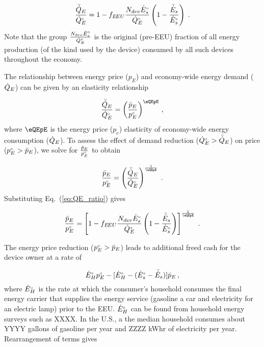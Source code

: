 \begin{equation} \label{eq:QE_ratio}
  \frac{\bar{\dot{Q}}_E}{{}{\dot{Q}}^{\scriptscriptstyle \circ}_E} =
        1 - f_{E\!EU} \frac{N_{dev} {}{\dot{E}}^{\scriptscriptstyle \circ}_s}{{}{\dot{Q}}^{\scriptscriptstyle \circ}_E} \left( 1 - \frac{\bar{\dot{E}}_s}{{}{\dot{E}}^{\scriptscriptstyle \circ}_s}  \right) \; .
\end{equation}
%
Note that the group $\frac{N_{dev} {}{\dot{E}}^{\scriptscriptstyle \circ}_s}{{}{\dot{Q}}^{\scriptscriptstyle \circ}_E}$
is the original (pre-EEU) fraction of all energy production
(of the kind used by the device)
consumed by all such devices throughout the economy.

The relationship between energy price ($p_E$) and
economy-wide energy demand ($\dot{Q}_E$)
can be given by an elasticity relationship

\begin{equation}
  \frac{\rainc{Q}_E}{\rorig{Q}_E} = 
          \left( \frac{\ainc{p}_E}{\orig{p}_E} \right)^{\eQEpE} \, ,
\end{equation}
%
where $\eQEpE$ is the energy price ($p_e$) elasticity
of economy-wide energy consumption ($\dot{Q}_E$).
To assess the effect of demand reduction
(${}{\dot{Q}}^{\scriptscriptstyle \circ}_E > \bar{\dot{Q}}_E$)
on price
(${}{p}^{\scriptscriptstyle \circ}_E > \bar{p}_E$),
we solve for $\frac{\bar{p}_E}{{}{p}^{\scriptscriptstyle \circ}_E}$
to obtain

\begin{equation}
  \frac{\ainc{p}_E}{\orig{p}_E} =
        \left( \frac{\rainc{Q}_E}{\rorig{Q}_E} \right)^{\frac{1}{\eQEpE}} \; .
\end{equation}
%
Substituting Eq.~(\ref{eq:QE_ratio}) gives

\begin{equation}
  \frac{\ainc{p}_E}{\orig{p}_E} =
        \left[ 1 - f_{\EEU} \frac{N_{dev} \rbempl{E}_s}{\rbempl{Q}_E} \left( 1 - \frac{\rainc{E}_s}{\rbempl{E}_s}  \right) \right]^{\frac{1}{\eQEpE}} \; .
\end{equation}

The energy price reduction (${}{p}^{\scriptscriptstyle \circ}_E > \bar{p}_E$)
leads to additional freed cash for the device owner at a rate of

\begin{equation}
  {}{\dot{E}}^{\scriptscriptstyle \circ}_H {}{p}^{\scriptscriptstyle \circ}_E - [{}{\dot{E}}^{\scriptscriptstyle \circ}_H - ({}{\dot{E}}^{\scriptscriptstyle \circ}_s - \bar{\dot{E}}_s)] \bar{p}_E \, ,
\end{equation}
%
where ${}{\dot{E}}^{\scriptscriptstyle \circ}_H$ is the rate at which the consumer's household 
consumes the final energy carrier that supplies
the energy service
(gasoline a car and
electricity for an electric lamp) 
prior to the EEU.
${}{\dot{E}}^{\scriptscriptstyle \circ}_H$ can be found from household energy surveys
such as XXXX.
In the U.S.,
a the median household consumes about
YYYY gallons of gasoline per year and 
ZZZZ kWhr of electricity per year.
Rearrangement of terms gives

